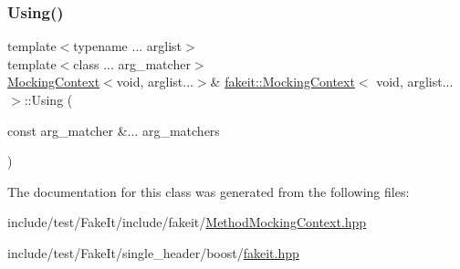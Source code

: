 \subsubsection{\texorpdfstring{Using()}{Using()}\hspace{0.1cm}{\footnotesize\ttfamily [18/18]}}
{\footnotesize\ttfamily template$<$typename ... arglist$>$ \\
template$<$class ... arg\+\_\+matcher$>$ \\
\mbox{\hyperlink{classfakeit_1_1MockingContext}{Mocking\+Context}}$<$void, arglist...$>$\& \mbox{\hyperlink{classfakeit_1_1MockingContext}{fakeit\+::\+Mocking\+Context}}$<$ void, arglist... $>$\+::Using (\begin{DoxyParamCaption}\item[{const arg\+\_\+matcher \&...}]{arg\+\_\+matchers }\end{DoxyParamCaption})\hspace{0.3cm}{\ttfamily [inline]}}



The documentation for this class was generated from the following files\+:\begin{DoxyCompactItemize}
\item 
include/test/\+Fake\+It/include/fakeit/\mbox{\hyperlink{MethodMockingContext_8hpp}{Method\+Mocking\+Context.\+hpp}}\item 
include/test/\+Fake\+It/single\+\_\+header/boost/\mbox{\hyperlink{single__header_2boost_2fakeit_8hpp}{fakeit.\+hpp}}\end{DoxyCompactItemize}
